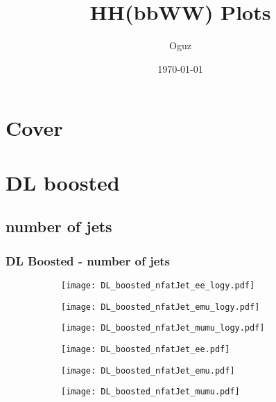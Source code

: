 \documentclass[aspectratio=169,8pt]{beamer}
\title{HH(bbWW) Plots}
\author{Oguz}
\institute{UCLouvain}
\date{\today}
\begin{document}
    \section{Cover}

    \frame{\titlepage}


\section{DL boosted}
\subsection{number of jets}
\begin{frame}
\frametitle{DL Boosted - number of jets}
\begin{figure}
\captionsetup[subfigure]{labelformat=empty}
\begin{subfigure}{0.32\textwidth}
\texttt{[image: DL\_boosted\_nfatJet\_ee\_logy.pdf]}
\vspace*{-0.15cm}
\end{subfigure}
\hfil
\begin{subfigure}{0.32\textwidth}
\texttt{[image: DL\_boosted\_nfatJet\_emu\_logy.pdf]}
\vspace*{-0.15cm}
\end{subfigure}
\hfil
\begin{subfigure}{0.32\textwidth}
\texttt{[image: DL\_boosted\_nfatJet\_mumu\_logy.pdf]}
\vspace*{-0.15cm}
\end{subfigure}
\hfil
\begin{subfigure}{0.32\textwidth}
\texttt{[image: DL\_boosted\_nfatJet\_ee.pdf]}
\vspace*{-0.15cm}
\end{subfigure}
\hfil
\begin{subfigure}{0.32\textwidth}
\texttt{[image: DL\_boosted\_nfatJet\_emu.pdf]}
\vspace*{-0.15cm}
\end{subfigure}
\hfil
\begin{subfigure}{0.32\textwidth}
\texttt{[image: DL\_boosted\_nfatJet\_mumu.pdf]}
\vspace*{-0.15cm}
\end{subfigure}
\hfil
\end{figure}
\end{frame}
\newpage
\end{document}
